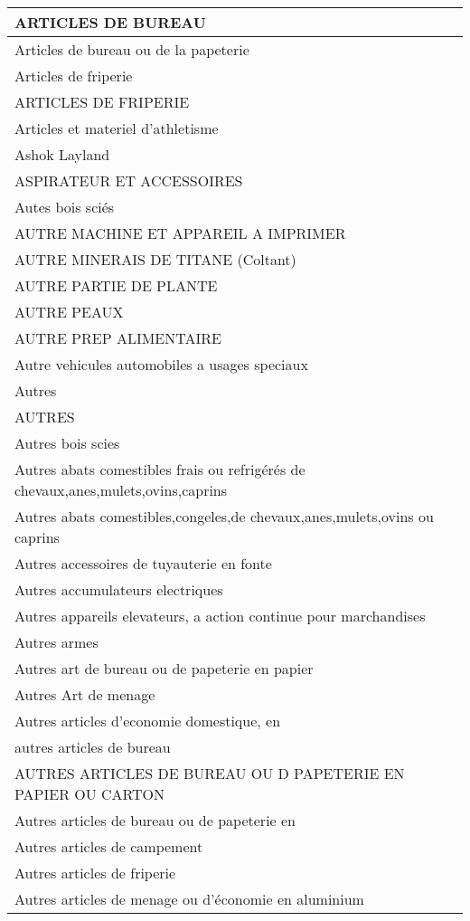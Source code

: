 \documentclass[
]{book}
\begin{document}
\begin{table}
\begin{tabular}[t]{l}
\hline
ARTICLES DE BUREAU\\
\hline
Articles de bureau ou de la papeterie\\
\hline
Articles de friperie\\
\hline
ARTICLES DE FRIPERIE\\
\hline
Articles et materiel d'athletisme\\
\hline
Ashok Layland\\
\hline
ASPIRATEUR ET ACCESSOIRES\\
\hline
Autes bois sciés\\
\hline
AUTRE MACHINE ET APPAREIL A IMPRIMER\\
\hline
AUTRE MINERAIS DE TITANE (Coltant)\\
\hline
AUTRE PARTIE DE PLANTE\\
\hline
AUTRE PEAUX\\
\hline
AUTRE PREP ALIMENTAIRE\\
\hline
Autre vehicules automobiles a usages speciaux\\
\hline
Autres\\
\hline
AUTRES\\
\hline
Autres  bois scies\\
\hline
Autres abats comestibles frais ou refrigérés de chevaux,anes,mulets,ovins,caprins\\
\hline
Autres abats comestibles,congeles,de chevaux,anes,mulets,ovins ou caprins\\
\hline
Autres accessoires de tuyauterie en fonte\\
\hline
Autres accumulateurs electriques\\
\hline
Autres appareils elevateurs, a action continue pour marchandises\\
\hline
Autres armes\\
\hline
Autres art de bureau ou de papeterie en papier\\
\hline
Autres Art de menage\\
\hline
Autres articles d'economie domestique, en\\
\hline
autres articles de bureau\\
\hline
AUTRES ARTICLES DE BUREAU OU D PAPETERIE EN PAPIER OU CARTON\\
\hline
Autres articles de bureau ou de papeterie en\\
\hline
Autres articles de campement\\
\hline
Autres articles de friperie\\
\hline
Autres articles de menage ou d'économie en aluminium\\

\end{tabular}
\end{table}
\end{document}
